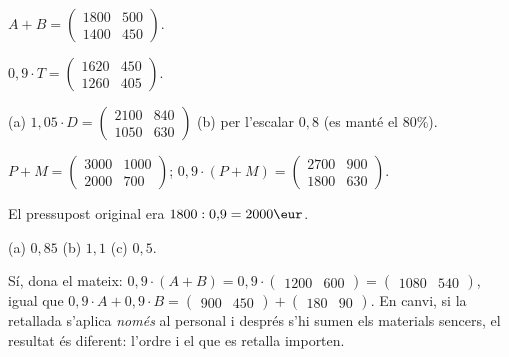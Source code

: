 \begin{solucions}
\begin{sollist}
  \item $A+B=\begin{pmatrix} 1800 & 500 \\ 1400 & 450 \end{pmatrix}$.
  \item $0{,}9\cdot T=\begin{pmatrix} 1620 & 450 \\ 1260 & 405 \end{pmatrix}$.
  \item (a) $1{,}05\cdot D=\begin{pmatrix} 2100 & 840 \\ 1050 & 630 \end{pmatrix}$
        \quad (b) per l'escalar $0{,}8$ (es manté el $80\%$).
  \item $P+M=\begin{pmatrix} 3000 & 1000 \\ 2000 & 700 \end{pmatrix}$;
        \;$0{,}9\cdot(P+M)=\begin{pmatrix} 2700 & 900 \\ 1800 & 630 \end{pmatrix}$.
  \item El pressupost original era $1800:0{,}9=2000\eur$.
  \item (a) $0{,}85$ \quad (b) $1{,}1$ \quad (c) $0{,}5$.
  \item Sí, dona el mateix: $0{,}9\cdot(A+B)=0{,}9\cdot\begin{pmatrix} 1200 & 600 \end{pmatrix}
        =\begin{pmatrix} 1080 & 540 \end{pmatrix}$, igual que
        $0{,}9\cdot A + 0{,}9\cdot B=\begin{pmatrix} 900 & 450 \end{pmatrix}+\begin{pmatrix} 180 & 90 \end{pmatrix}$.
        En canvi, si la retallada s'aplica \emph{només} al personal i després s'hi
        sumen els materials sencers, el resultat és diferent: l'ordre i el que es
        retalla importen.
\end{sollist}
\end{solucions}

